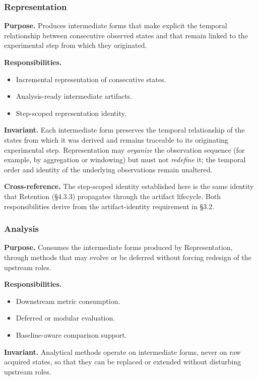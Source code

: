   \subsubsection{Representation}\label{subsubsec:representation}
  \textbf{Purpose.} Produces intermediate forms that make explicit the temporal relationship between consecutive observed states and that remain linked to the experimental step from which they originated.

  \textbf{Responsibilities.}
  \begin{itemize}
    \item Incremental representation of consecutive states.
    \item Analysis-ready intermediate artifacts.
    \item Step-scoped representation identity.
  \end{itemize}

  \textbf{Invariant.} Each intermediate form preserves the temporal relationship of the states from which it was derived and remains traceable to its originating experimental step. Representation may \emph{organize} the observation sequence (for example, by aggregation or windowing) but must not \emph{redefine} it; the temporal order and identity of the underlying observations remain unaltered.

  \textbf{Cross-reference.} The step-scoped identity established here is the same identity that Retention (\S4.3.3) propagates through the artifact lifecycle. Both responsibilities derive from the artifact-identity requirement in \S3.2.

  \subsubsection{Analysis}\label{subsubsec:analysis}
  \textbf{Purpose.} Consumes the intermediate forms produced by Representation, through methods that may evolve or be deferred without forcing redesign of the upstream roles.

  \textbf{Responsibilities.}
  \begin{itemize}
    \item Downstream metric consumption.
    \item Deferred or modular evaluation.
    \item Baseline-aware comparison support.
  \end{itemize}

  \textbf{Invariant.} Analytical methods operate on intermediate forms, never on raw acquired states, so that they can be replaced or extended without disturbing upstream roles.

